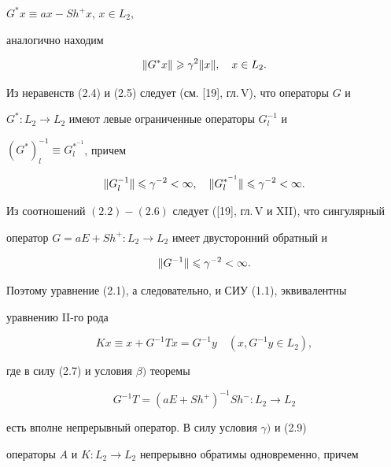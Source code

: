 $G^*x\equiv ax-Sh^+x$, $x\in L_2,$


аналогично находим


\begin{equation}


\|G^*x\|\gea \gamma^2\|x\|,\quad x\in L_2.


\end{equation}


Из неравенств (2.4) и (2.5) следует (см. [19], гл.\,V), что операторы $G$ и


$G^*:L_2\to L_2$ имеют левые ограниченные операторы $G_l^{-1}$ и


$(G^*)_l^{-1}\equiv G_l^{*^{-1}}$, причем


\begin{equation}


\|G_l^{-1}\|\lea \gamma^{-2}<\infty,\quad \|G_l^{*^{-1}}\|\lea


\gamma^{-2}<\infty.


\end{equation}


Из соотношений $(2.2)-(2.6)$ следует ([19], гл.\,V и XII), что сингулярный


оператор $G=aE+Sh^+:L_2\to L_2$ имеет двусторонний обратный и


\begin{equation}


\|G^{-1}\|\lea \gamma^{-2}<\infty.


\end{equation}


Поэтому уравнение (2.1), а следовательно, и СИУ (1.1), эквивалентны


уравнению II-го рода


\begin{equation}


Kx \equiv x + G^{-1}Tx = G^{-1}y \quad (x,G^{-1}y\in L_2),


\end{equation}


где в силу (2.7) и условия $\beta)$ теоремы


\begin{equation}


G^{-1}T = (aE+Sh^+)^{-1}Sh^-:L_2\to L_2


\end{equation}


есть вполне непрерывный оператор. В силу условия $\gamma)$ и (2.9)


операторы $A$ и $K:L_2\to L_2$ непрерывно обратимы одновременно, причем


